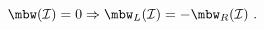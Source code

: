 \begin{equation}
\mbw(\mathcal{I})=0 \Rightarrow 
\mbw_L(\mathcal{I})=- \mbw_R(\mathcal{I}) \ . 
\end{equation}

